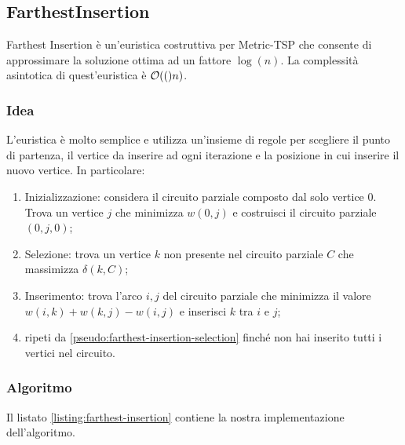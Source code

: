 \newpage

\subsection{FarthestInsertion}

Farthest Insertion è un'euristica costruttiva per Metric-TSP che consente di
approssimare la soluzione ottima ad un fattore $\log(n)$. La complessità asintotica di
quest'euristica è $\mathcal{O}(()n)$.

\subsubsection{Idea}

L'euristica è molto semplice e utilizza un'insieme di regole per
scegliere il punto di partenza, il vertice da inserire ad ogni
iterazione e la posizione in cui inserire il nuovo vertice. In
particolare:

\begin{enumerate}
    \item Inizializzazione: considera il circuito parziale composto
      dal solo vertice $0$. Trova un vertice $j$ che minimizza $w(0,
      j)$ e costruisci il circuito parziale $(0, j,0)$;
    \item Selezione: trova un vertice $k$ non presente nel circuito
      parziale $C$ che massimizza $\delta(k,C)$;
    \label{pseudo:farthest-insertion-selection}
    \item Inserimento: trova l’arco ${i, j}$ del circuito parziale che
      minimizza il valore $w(i, k) + w(k, j) - w(i, j)$ e inserisci
      $k$ tra $i$ e $j$;
    \item ripeti da \ref{pseudo:farthest-insertion-selection} finché
      non hai inserito tutti i vertici nel circuito.
\end{enumerate}

\subsubsection{Algoritmo}

\noindent Il listato \ref{listing:farthest-insertion} contiene la
nostra implementazione dell'algoritmo.

